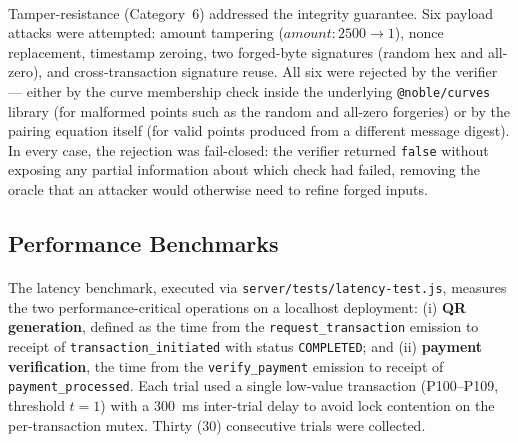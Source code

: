\paragraph{}Tamper-resistance (Category~6) addressed the integrity guarantee. Six payload attacks were attempted: amount tampering ($\textit{amount}: 2500 \to 1$), nonce replacement, timestamp zeroing, two forged-byte signatures (random hex and all-zero), and cross-transaction signature reuse. All six were rejected by the verifier --- either by the curve membership check inside the underlying \texttt{@noble/curves} library (for malformed points such as the random and all-zero forgeries) or by the pairing equation itself (for valid points produced from a different message digest). In every case, the rejection was fail-closed: the verifier returned \texttt{false} without exposing any partial information about which check had failed, removing the oracle that an attacker would otherwise need to refine forged inputs.

\subsection{Performance Benchmarks}
\label{sect:results_perf}

\paragraph{}The latency benchmark, executed via \texttt{server/tests/latency-test.js}, measures the two performance-critical operations on a localhost deployment: (i) \textbf{QR generation}, defined as the time from the \texttt{request\_transaction} emission to receipt of \texttt{transaction\_initiated} with status \texttt{COMPLETED}; and (ii) \textbf{payment verification}, the time from the \texttt{verify\_payment} emission to receipt of \texttt{payment\_processed}. Each trial used a single low-value transaction (₱100--₱109, threshold $t = 1$) with a 300~ms inter-trial delay to avoid lock contention on the per-transaction mutex. Thirty (30) consecutive trials were collected.

